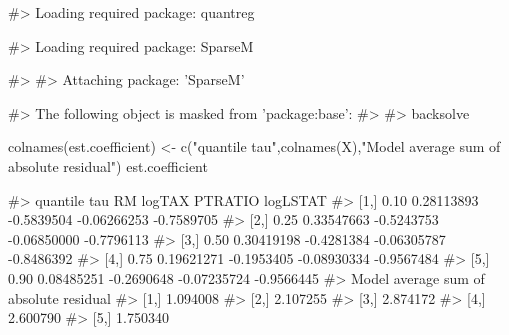 \begin{Schunk}
\begin{Soutput}
#> Loading required package: quantreg
\end{Soutput}
\begin{Soutput}
#> Loading required package: SparseM
\end{Soutput}
\begin{Soutput}
#> 
#> Attaching package: 'SparseM'
\end{Soutput}
\begin{Soutput}
#> The following object is masked from 'package:base':
#> 
#>     backsolve
\end{Soutput}
\begin{Sinput}
colnames(est.coefficient) <- c("quantile tau",colnames(X),"Model average sum of absolute residual")
est.coefficient
\end{Sinput}
\begin{Soutput}
#>      quantile tau         RM     logTAX     PTRATIO   logLSTAT
#> [1,]         0.10 0.28113893 -0.5839504 -0.06266253 -0.7589705
#> [2,]         0.25 0.33547663 -0.5243753 -0.06850000 -0.7796113
#> [3,]         0.50 0.30419198 -0.4281384 -0.06305787 -0.8486392
#> [4,]         0.75 0.19621271 -0.1953405 -0.08930334 -0.9567484
#> [5,]         0.90 0.08485251 -0.2690648 -0.07235724 -0.9566445
#>      Model average sum of absolute residual
#> [1,]                               1.094008
#> [2,]                               2.107255
#> [3,]                               2.874172
#> [4,]                               2.600790
#> [5,]                               1.750340
\end{Soutput}
\end{Schunk}

